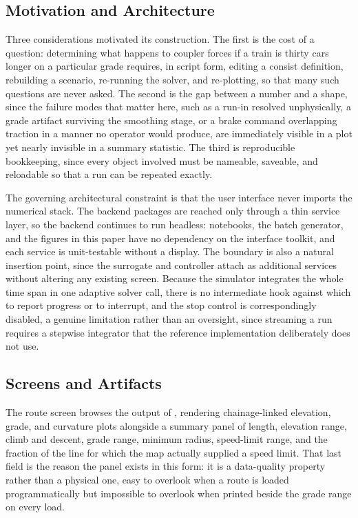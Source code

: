 \documentclass[numbered]{trbunofficial}
\begin{document}
\subsection{Motivation and Architecture}

Three considerations motivated its construction. The first is the cost of a question: determining what happens to coupler forces if a train is thirty cars longer on a particular grade requires, in script form, editing a consist definition, rebuilding a scenario, re-running the solver, and re-plotting, so that many such questions are never asked. The second is the gap between a number and a shape, since the failure modes that matter here, such as a run-in resolved unphysically, a grade artifact surviving the smoothing stage, or a brake command overlapping traction in a manner no operator would produce, are immediately visible in a plot yet nearly invisible in a summary statistic. The third is reproducible bookkeeping, since every object involved must be nameable, saveable, and reloadable so that a run can be repeated exactly.

The governing architectural constraint is that the user interface never imports the numerical stack. The backend packages are reached only through a thin service layer, so the backend continues to run headless: notebooks, the batch generator, and the figures in this paper have no dependency on the interface toolkit, and each service is unit-testable without a display. The boundary is also a natural insertion point, since the surrogate and controller attach as additional services without altering any existing screen. Because the simulator integrates the whole time span in one adaptive solver call, there is no intermediate hook against which to report progress or to interrupt, and the stop control is correspondingly disabled, a genuine limitation rather than an oversight, since streaming a run requires a stepwise integrator that the reference implementation deliberately does not use.

\subsection{Screens and Artifacts}

The route screen browses the output of , rendering chainage-linked elevation, grade, and curvature plots alongside a summary panel of length, elevation range, climb and descent, grade range, minimum radius, speed-limit range, and the fraction of the line for which the map actually supplied a speed limit. That last field is the reason the panel exists in this form: it is a data-quality property rather than a physical one, easy to overlook when a route is loaded programmatically but impossible to overlook when printed beside the grade range on every load.
\end{document}
